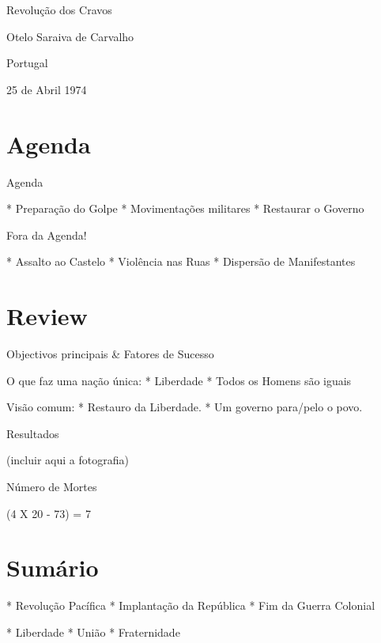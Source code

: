 \documentclass{beamer}
\begin{document}
Revolução dos Cravos

Otelo Saraiva de Carvalho

Portugal

25 de Abril 1974

\section{Agenda}

Agenda

  * Preparação do Golpe
  * Movimentações militares
  * Restaurar o Governo

Fora da Agenda!

  * Assalto ao Castelo
  * Violência nas Ruas
  * Dispersão de Manifestantes

\section{Review}

Objectivos principais \& Fatores de Sucesso

O que faz uma nação única:
  * Liberdade
  * Todos os Homens são iguais

Visão comum:
  * Restauro da Liberdade.
  * Um governo para/pelo o povo.

Resultados

(incluir aqui a fotografia)

Número de Mortes

(4 X 20 - 73) = 7

\section{Sumário}

* Revolução Pacífica
* Implantação da República
* Fim da Guerra Colonial

* Liberdade
* União
* Fraternidade
\end{document}
